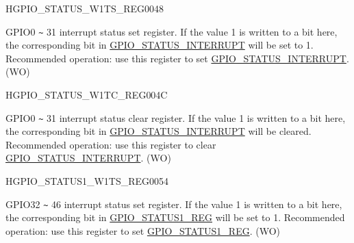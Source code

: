 \begin{register}{H}{GPIO\_STATUS\_W1TS\_REG}{\hexprefix{}0048}\label{regdesc:GPIOSTATUSW1TSREG}
%
\regnewline%
\begin{regdesc}\begin{reglist}
\label{fielddesc:GPIOSTATUSW1TS}\item [GPIO\_STATUS\_W1TS] GPIO0 \verb+~+ 31 interrupt status set register. If the value 1 is written to a bit here, the corresponding bit in \hyperref[fielddesc:GPIOSTATUSINTERRUPT]{GPIO\_STATUS\_INTERRUPT} will be set to 1. Recommended operation: use this register to set \hyperref[fielddesc:GPIOSTATUSINTERRUPT]{GPIO\_STATUS\_INTERRUPT}. (WO)
\end{reglist}\end{regdesc}
\end{register}


\begin{register}{H}{GPIO\_STATUS\_W1TC\_REG}{\hexprefix{}004C}\label{regdesc:GPIOSTATUSW1TCREG}
%
\regnewline%
\begin{regdesc}\begin{reglist}
\label{fielddesc:GPIOSTATUSW1TC}\item [GPIO\_STATUS\_W1TC] GPIO0 \verb+~+ 31 interrupt status clear register. If the value 1 is written to a bit here, the corresponding bit in \hyperref[fielddesc:GPIOSTATUSINTERRUPT]{GPIO\_STATUS\_INTERRUPT} will be cleared. Recommended operation: use this register to clear \hyperref[fielddesc:GPIOSTATUSINTERRUPT]{GPIO\_STATUS\_INTERRUPT}. (WO)
\end{reglist}\end{regdesc}
\end{register}


\begin{register}{H}{GPIO\_STATUS1\_W1TS\_REG}{\hexprefix{}0054}\label{regdesc:GPIOSTATUS1W1TSREG}
%
%
\regnewline%
\begin{regdesc}\begin{reglist}
\label{fielddesc:GPIOSTATUS1W1TS}\item [GPIO\_STATUS1\_W1TS] GPIO32 \verb+~+ 46 interrupt status set register. If the value 1 is written to a bit here, the corresponding bit in \hyperref[fielddesc:GPIOSTATUS1INTERRUPT]{GPIO\_STATUS1\_REG} will be set to 1. Recommended operation: use this register to set \hyperref[fielddesc:GPIOSTATUS1INTERRUPT]{GPIO\_STATUS1\_REG}. (WO)
\end{reglist}\end{regdesc}
\end{register}


